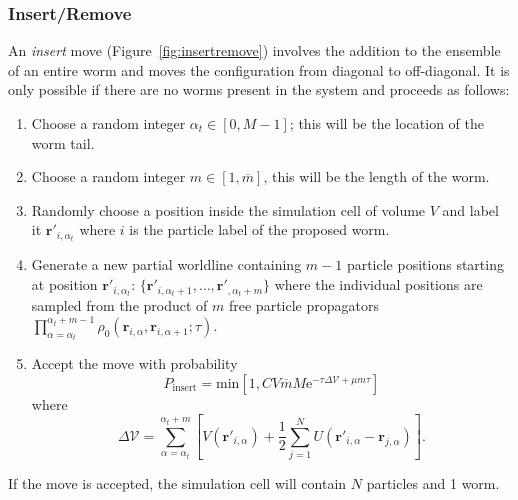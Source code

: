 \documentclass[prb,10pt,aps,floatfix,notitlepage]{revtex4-1}
\renewcommand{\vec}[1]{\boldsymbol{#1}}
\newcommand{\e}[1]{\mathrm{e}^{#1}}
\begin{document}
\subsubsection{Insert/Remove}
 An \emph{insert} move (Figure~\ref{fig:insertremove}) involves the addition to
 the ensemble of an entire worm and moves the configuration from diagonal to
 off-diagonal.  It is only possible if there are no worms present in the system
 and proceeds as follows:
\begin{enumerate}
    \item Choose a random integer $\alpha_t \in [0,M-1]$; this will be the
        location of the worm tail.
    \item Choose a random integer $m \in [1,\overline{m}]$, this will be the
        length of the worm.
    \item Randomly choose a position inside the simulation cell of volume $V$
        and label it $\vec{r}'_{i,\alpha_t}$ where $i$ is the particle label of
        the proposed worm.
    \item Generate a new partial worldline containing $m-1$ particle positions
        starting at position $\vec{r}'_{i,\alpha_t}$: $\{\vec{r}'_{i,\alpha_t+1},\ldots,
    \vec{r}'_{,\alpha_t+m}\}$ where the individual positions are sampled from
    the product of $m$ free particle propagators
    $\prod_{\alpha=\alpha_t}^{\alpha_t+m-1}
    \rho_0(\vec{r}_{i,\alpha},\vec{r}_{i,\alpha+1};\tau)$.
\item Accept the move with probability
\begin{equation}
    P_{\text{insert}} = \mathrm{min} \left[1,
C V \overline{m}M \e{-\tau \Delta \mathcal{V} + \mu m \tau} \right]
\end{equation}
%
where
%
\begin{equation}
    \Delta\mathcal{V} = \sum_{\alpha=\alpha_t}^{\alpha_t+m} \left[ 
        V(\vec{r}'_{i,\alpha}) + \frac{1}{2}\sum_{j=1}^N
        U(\vec{r}'_{i,\alpha}-\vec{r}_{j,\alpha}) \right].
\end{equation}
%
\end{enumerate}
If the move is accepted, the simulation cell will contain $N$ particles and 1
worm.\\[2ex]
%
\end{document}
